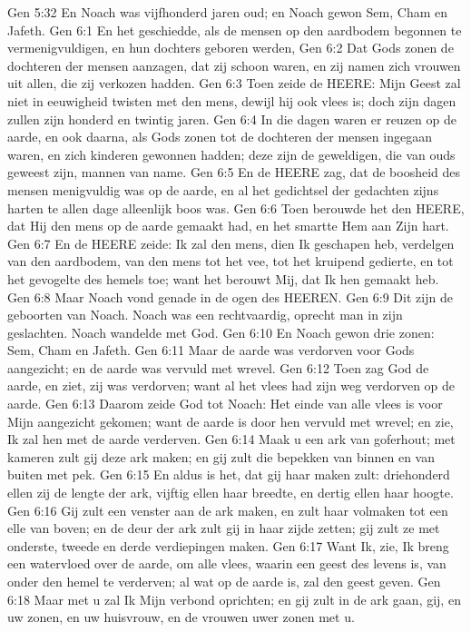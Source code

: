 Gen 5:32  En Noach was vijfhonderd jaren oud; en Noach gewon Sem, Cham en Jafeth.
Gen 6:1  En het geschiedde, als de mensen op den aardbodem begonnen te vermenigvuldigen, en hun dochters geboren werden,
Gen 6:2  Dat Gods zonen de dochteren der mensen aanzagen, dat zij schoon waren, en zij namen zich vrouwen uit allen, die zij verkozen hadden.
Gen 6:3  Toen zeide de HEERE: Mijn Geest zal niet in eeuwigheid twisten met den mens, dewijl hij ook vlees is; doch zijn dagen zullen zijn honderd en twintig jaren.
Gen 6:4  In die dagen waren er reuzen op de aarde, en ook daarna, als Gods zonen tot de dochteren der mensen ingegaan waren, en zich kinderen gewonnen hadden; deze zijn de geweldigen, die van ouds geweest zijn, mannen van name.
Gen 6:5  En de HEERE zag, dat de boosheid des mensen menigvuldig was op de aarde, en al het gedichtsel der gedachten zijns harten te allen dage alleenlijk boos was.
Gen 6:6  Toen berouwde het den HEERE, dat Hij den mens op de aarde gemaakt had, en het smartte Hem aan Zijn hart.
Gen 6:7  En de HEERE zeide: Ik zal den mens, dien Ik geschapen heb, verdelgen van den aardbodem, van den mens tot het vee, tot het kruipend gedierte, en tot het gevogelte des hemels toe; want het berouwt Mij, dat Ik hen gemaakt heb.
Gen 6:8  Maar Noach vond genade in de ogen des HEEREN.
Gen 6:9  Dit zijn de geboorten van Noach. Noach was een rechtvaardig, oprecht man in zijn geslachten. Noach wandelde met God.
Gen 6:10  En Noach gewon drie zonen: Sem, Cham en Jafeth.
Gen 6:11  Maar de aarde was verdorven voor Gods aangezicht; en de aarde was vervuld met wrevel.
Gen 6:12  Toen zag God de aarde, en ziet, zij was verdorven; want al het vlees had zijn weg verdorven op de aarde.
Gen 6:13  Daarom zeide God tot Noach: Het einde van alle vlees is voor Mijn aangezicht gekomen; want de aarde is door hen vervuld met wrevel; en zie, Ik zal hen met de aarde verderven.
Gen 6:14  Maak u een ark van goferhout; met kameren zult gij deze ark maken; en gij zult die bepekken van binnen en van buiten met pek.
Gen 6:15  En aldus is het, dat gij haar maken zult: driehonderd ellen zij de lengte der ark, vijftig ellen haar breedte, en dertig ellen haar hoogte.
Gen 6:16  Gij zult een venster aan de ark maken, en zult haar volmaken tot een elle van boven; en de deur der ark zult gij in haar zijde zetten; gij zult ze met onderste, tweede en derde verdiepingen maken.
Gen 6:17  Want Ik, zie, Ik breng een watervloed over de aarde, om alle vlees, waarin een geest des levens is, van onder den hemel te verderven; al wat op de aarde is, zal den geest geven.
Gen 6:18  Maar met u zal Ik Mijn verbond oprichten; en gij zult in de ark gaan, gij, en uw zonen, en uw huisvrouw, en de vrouwen uwer zonen met u.
